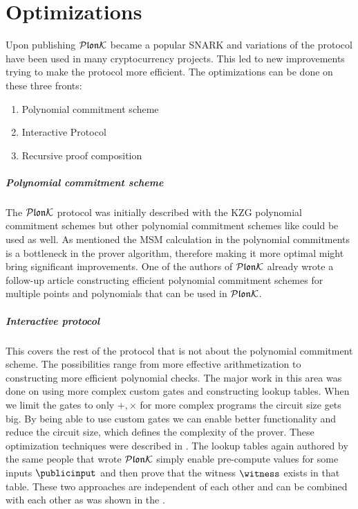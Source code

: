 \chapter{Optimizations}
\label{optimization}

Upon publishing $\mathcal{P}\mathfrak{lon}\mathcal{K}$ became a popular SNARK and variations of the protocol have been used in many cryptocurrency projects. This led to new improvements trying to make the protocol more efficient. The optimizations can be done on these three fronts:
\begin{enumerate}
    \item Polynomial commitment scheme 
    \item Interactive Protocol
    \item Recursive proof composition
\end{enumerate}

\paragraph{Polynomial commitment scheme} The $\mathcal{P}\mathfrak{lon}\mathcal{K}$ protocol was initially described with the KZG \cite{KZG} polynomial commitment schemes but other polynomial commitment schemes like \cite{FRI} could be used as well. As mentioned the MSM calculation in the polynomial commitments is a bottleneck in the prover algorithm, therefore making it more optimal might bring significant improvements. One of the authors of $\mathcal{P}\mathfrak{lon}\mathcal{K}$ already wrote a follow-up article constructing efficient polynomial commitment schemes for multiple points and polynomials \cite{shplonk} that can be used in $\mathcal{P}\mathfrak{lon}\mathcal{K}$.

\paragraph{Interactive protocol} This covers the rest of the protocol that is not about the polynomial commitment scheme. The possibilities range from more effective arithmetization to constructing more efficient polynomial checks. The major work in this area was done on using more complex custom gates and constructing lookup tables. When we limit the gates to only $+, \times$ for more complex programs the circuit size gets big. By being able to use custom gates we can enable better functionality and reduce the circuit size, which defines the complexity of the prover. These optimization techniques were described in \cite{turboplonk}. The lookup tables again authored by the same people that wrote $\mathcal{P}\mathfrak{lon}\mathcal{K}$ \cite{plookup} simply enable pre-compute values for some inputs $\publicinput$ and then prove that the witness $\witness$ exists in that table. These two approaches are independent of each other and can be combined with each other as was shown in the \cite{HyperPlonk}.

